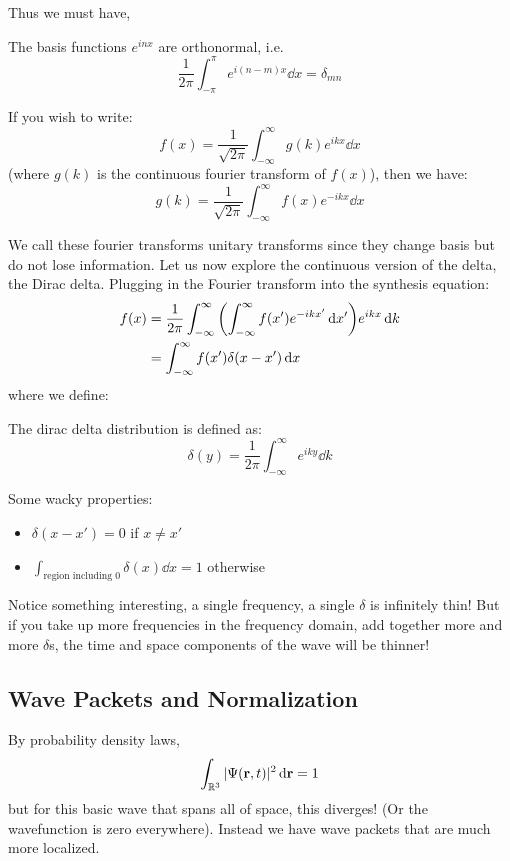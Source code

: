 Thus we must have,
\begin{theorem}
    The basis functions $e^{inx}$ are orthonormal, i.e.
    \[ \frac{1}{2\pi} \int_{-\pi}^{\pi} e^{i(n - m) x} \dd{x} = \delta_{mn} \]
\end{theorem}

\begin{theorem}
    If you wish to write:
    \[ f(x) = \frac{1}{\sqrt{2 \pi}} \int_{-\infty}^{\infty} g(k) e^{i kx} \dd{x} \]
    (where $g(k)$ is the continuous fourier transform of $f(x)$), then we have:
    \[ g(k) = \frac{1}{\sqrt{2 \pi}} \int_{-\infty}^{\infty} f(x) e^{-ikx} \dd{x} \]
\end{theorem}

We call these fourier transforms unitary transforms since they change basis but do not lose information.
Let us now explore the continuous version of the delta, the Dirac delta. Plugging in the Fourier transform into the synthesis equation:
\begin{align*}
    f(x) &= \frac{1}{2 \pi} \int_{-\infty}^{\infty} \qty(\int_{-\infty}^{\infty} f(x') e^{-ikx'} \dd{x'}) e^{ikx} \dd{k} \\
    &= \int_{-\infty}^{\infty} f(x') \delta(x - x') \dd{x}
\end{align*}
where we define:
\begin{definition}
    The dirac delta distribution is defined as:
    \[ \delta(y) = \frac{1}{2\pi} \int_{-\infty}^{\infty} e^{iky} \dd{k} \]
\end{definition}
Some wacky properties:
\begin{itemize}
    \item $\delta(x - x') = 0$ if $x \neq x'$
    \item $\int_{\text{region including }0} \delta(x) \dd{x} = 1$ otherwise
\end{itemize}
Notice something interesting, a single frequency, a single $\delta$ is infinitely thin! But if you take up more frequencies in the frequency domain, add together more and more $\delta$s,
the time and space components of the wave will be thinner!

\subsection{Wave Packets and Normalization}
By probability density laws,
\[ \int_{\mathbb{R}^3} |\Psi(\mathbf{r}, t)|^2 \dd{\mathbf{r}} = 1 \]
but for this basic wave that spans all of space, this diverges! (Or the wavefunction is zero everywhere). Instead we have
wave packets that are much more localized.


